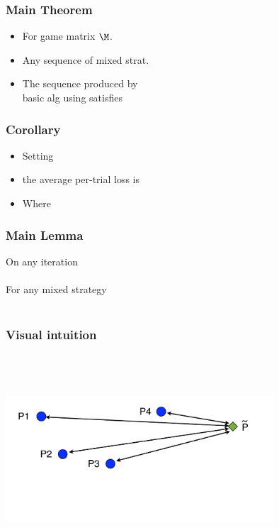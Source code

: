 \documentclass[handout]{beamer}
\begin{document}
\begin{frame}
\frametitle{Main Theorem}
\begin{itemize}
\item For  game matrix $\M$.
\item Any sequence of mixed strat. 
\item The sequence  produced by \\
basic alg using  satisfies
\end{itemize}
\end{frame}

\begin{frame}
\frametitle{Corollary}
\begin{itemize}
\item Setting 
\item the average per-trial loss is
\item Where 
\R{\[
\delt = \sqrt{2 \ln n \over T} + {\ln n \over T} 
= O\paren{\sqrt{\frac{\ln n}{T}}}.
\]}
\end{itemize}
\end{frame}

\begin{frame}
\frametitle{Main Lemma}

On any iteration 
\\ ~ \\ \pause
For any mixed strategy \R{$\Pref$}
\\ ~ \\ \pause
{}
\end{frame}

\begin{frame}
\frametitle{Visual intuition}

\pause \\ ~ \\ ~ \\
\includegraphics[width=10cm]{figures/divergenceAnalysis.pdf}
\end{frame}
\end{document}
